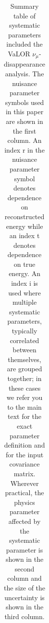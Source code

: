 {\begin{table}[htb]
\begin{tabular}{p{}p{}p{}}
{}\\
\hline
\end{tabular}\\[2pt]
\caption{
  Summary table of systematic parameters included the VaLOR $\nu_{\mu}$-disappearance analysis.
  The nuisance parameter symbols used in this paper are shown in the first column.
  An index r in the nuisance parameter symbol denotes dependence on reconstructed energy while an index t denotes 
  dependence on true energy.
  An index i is used where multiple systematic parameters, typically correlated between themselves, are grouped together;
  in these cases we refer you to the main text for the exact parameter definition and for the input covariance matrix.
  Wherever practical, 
  the physics parameter affected by the systematic parameter is shown in the second column
  and the size of the uncertainty is shown in the third column.
}
\label{tab:input_uncertainties}
\end{table}
}



